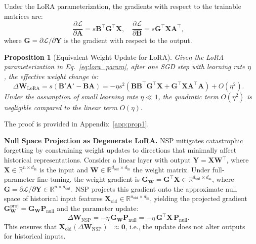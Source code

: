 \documentclass{article}
\newtheorem{proposition}[theorem]{Proposition}
\begin{document}
Under the LoRA parameterization, the gradients with respect to the trainable matrices are:
\begin{equation}
    \frac{\partial \mathcal{L}}{\partial \mathbf{A}} = s\mathbf{B}^\top \mathbf{G}^\top \mathbf{X}, \quad \frac{\partial \mathcal{L}}{\partial \mathbf{B}} = s\mathbf{G}^\top \mathbf{X}\mathbf{A}^\top,
    \label{eq:lora_grad}
\end{equation}
where $\mathbf{G} = \partial \mathcal{L} / \partial \mathbf{Y}$ is the gradient with respect to the output.

\begin{proposition}[Equivalent Weight Update for LoRA]
\label{prop:lora_update}
Given the LoRA parameterization in Eq.~\eqref{eq:lora_param}, after one SGD step with learning rate $\eta$, the effective weight change is:
\begin{equation}
    \Delta \mathbf{W}_{\text{LoRA}} = s(\mathbf{B}'\mathbf{A}' - \mathbf{B}\mathbf{A}) = -\eta s^2 \left( \mathbf{B}\mathbf{B}^\top \mathbf{G}^\top \mathbf{X} + \mathbf{G}^\top \mathbf{X}\mathbf{A}^\top \mathbf{A} \right) + O(\eta^2).
    \label{eq:lora_update}
\end{equation}
Under the assumption of small learning rate $\eta \ll 1$, the quadratic term $O(\eta^2)$ is negligible compared to the linear term $O(\eta)$.
\end{proposition}

The proof is provided in Appendix~\ref{app:prop1}.

\textbf{Null Space Projection as Degenerate LoRA.}
NSP mitigates catastrophic forgetting by constraining weight updates to directions that minimally affect historical representations. Consider a linear layer with output $\mathbf{Y} = \mathbf{X}\mathbf{W}^\top$, where $\mathbf{X} \in \mathbb{R}^{n \times d_{\text{in}}}$ is the input and $\mathbf{W} \in \mathbb{R}^{d_{\text{out}} \times d_{\text{in}}}$ the weight matrix. Under full-parameter fine-tuning, the weight gradient is $\mathbf{G}_{\mathbf{W}} = \mathbf{G}^\top \mathbf{X} \in \mathbb{R}^{d_{\text{out}} \times d_{\text{in}}}$, where $\mathbf{G} = \partial \mathcal{L} / \partial \mathbf{Y} \in \mathbb{R}^{n \times d_{\text{out}}}$. NSP projects this gradient onto the approximate null space of historical input features $\mathbf{X}_{\text{old}} \in \mathbb{R}^{n_{\text{old}} \times d_{\text{in}}}$, yielding the projected gradient $\mathbf{G}_{\mathbf{W}}^{\text{proj}} = \mathbf{G}_{\mathbf{W}} \mathbf{P}_{\text{null}}$ and the parameter update:
\begin{equation}
    \Delta \mathbf{W}_{\text{NSP}} = -\eta \, \mathbf{G}_{\mathbf{W}} \mathbf{P}_{\text{null}} = -\eta \, \mathbf{G}^\top \mathbf{X} \, \mathbf{P}_{\text{null}}.
    \label{eq:nsp_update}
\end{equation}
This ensures that $\mathbf{X}_{\text{old}} (\Delta \mathbf{W}_{\text{NSP}})^\top \approx \mathbf{0}$, i.e., the update does not alter outputs for historical inputs.
\end{document}
